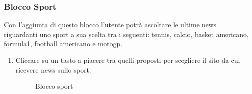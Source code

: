 \subsubsection{Blocco Sport}
Con l'aggiunta di questo blocco l'utente potrà ascoltare le ultime news riguardanti uno sport a sua scelta tra i seguenti: tennis, calcio, basket americano, formula1, football americano e motogp.
\begin{enumerate}
	\item Cliccare su un tasto a piacere tra quelli proposti per scegliere il sito da cui ricevere news sullo sport.
	\begin{figure}[!ht]
		\centering
		\caption{Blocco sport}
	\end{figure}
\end{enumerate}
\newpage
